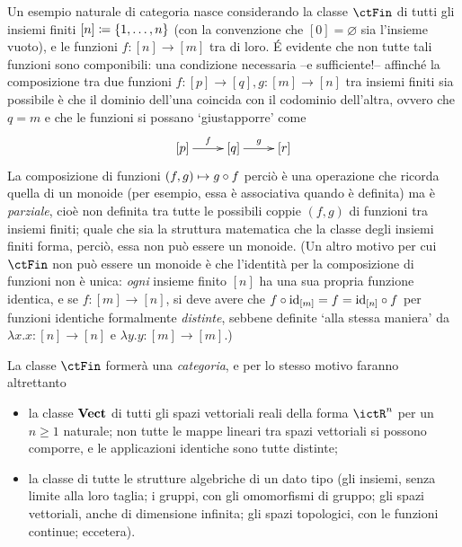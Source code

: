 \begin{example}
Un esempio naturale di categoria nasce considerando la classe $\ctFin$ di tutti gli insiemi finiti $[n]\coloneqq \{1,\dots,n\}$ (con la convenzione che $[0]=\varnothing$ sia l'insieme vuoto), e le funzioni $f : [n] \to [m]$ tra di loro. \'E evidente che non tutte tali funzioni sono componibili: una condizione necessaria --e sufficiente!-- affinché la composizione tra due funzioni $f : [p] \to [q],g : [m] \to [n]$ tra insiemi finiti sia possibile è che il dominio dell'una coincida con il codominio dell'altra, ovvero che $q=m$ e che le funzioni si possano `giustapporre' come
\[\xymatrix{
    [p] \ar[r]^-f & [q] \ar[r]^-g & [r]
}\]
La composizione di funzioni $(f,g)\mapsto g\circ f$ perciò è una operazione che ricorda quella di un monoide (per esempio, essa è associativa quando è definita) ma è \emph{parziale}, cioè non definita tra tutte le possibili coppie $(f,g)$ di funzioni tra insiemi finiti; quale che sia la struttura matematica che la classe degli insiemi finiti forma, perciò, essa non può essere un monoide. (Un altro motivo per cui $\ctFin$ non può essere un monoide è che l'identità per la composizione di funzioni non è unica: \emph{ogni} insieme finito $[n]$ ha una sua propria funzione identica, e se $f : [m]\to [n]$, si deve avere che $f\circ \mathrm{id}_{[m]}=f=\mathrm{id}_{[n]}\circ f$ per funzioni identiche formalmente \emph{distinte}, sebbene definite `alla stessa maniera' da $\lambda x.x : [n]\to [n]$ e $\lambda y.y : [m]\to [m]$.)

La classe $\ctFin$ formerà una \emph{categoria}, e per lo stesso motivo faranno altrettanto
\begin{itemize}
    \item {} la classe $\mathbf{Vect}$ di tutti gli spazi vettoriali reali della forma $\ictR^n$ per un $n\ge 1$ naturale; non tutte le mappe lineari tra spazi vettoriali si possono comporre, e le applicazioni identiche sono tutte distinte;
    \item la classe di tutte le strutture algebriche di un dato tipo (gli insiemi, senza limite alla loro taglia; i gruppi, con gli omomorfismi di gruppo; gli spazi vettoriali, anche di dimensione infinita; gli spazi topologici, con le funzioni continue; eccetera).
\end{itemize}
\end{example}
